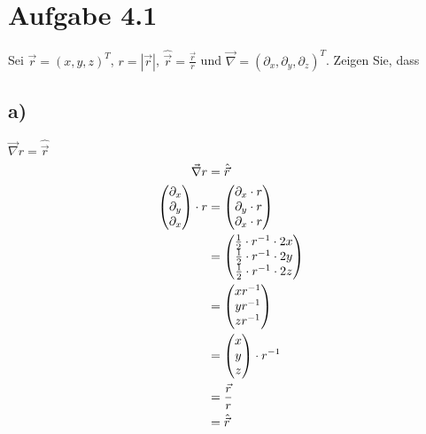 \documentclass{theozettel}
\begin{document}

\section*{Aufgabe 4.1}Sei $\vec{r}=\left(x,y,z\right)^T$, $r=\left|\vec{r}\right|$, $\hat{\vec{r}}=\frac{\vec{r}}{r}$ und $\vec{\nabla}=\left(\partial_x,\partial_y,\partial_z\right)^T$. Zeigen Sie, dass
\subsection*{a)}$\vec{\nabla}r=\hat{\vec{r}}$
\begin{align*}
\vec{\nabla}r&=\hat{\vec{r}}\\
\mqty(\partial_x\\\partial_y \\\partial_x  )\cdot r&=\mqty(\partial_x\cdot r\\\partial_y\cdot r \\\partial_x\cdot r  )\\
&=\mqty(\frac{1}{2}\cdot r^{-1}\cdot 2x\\\frac{1}{2}\cdot r^{-1}\cdot 2y\\\frac{1}{2}\cdot r^{-1}\cdot 2z)\\
&=\mqty(xr^{-1}\\yr^{-1}\\zr^{-1})\\
&=\mqty(x\\y\\z)\cdot r^{-1}\\
&=\frac{\vec{r}}{r}\\
&=\hat{\vec{r}}
\end{align*}
\end{document}
